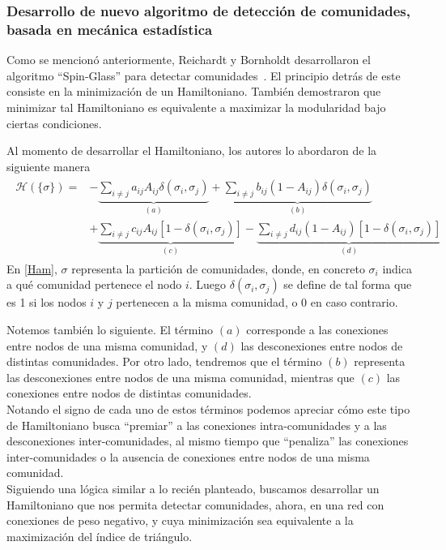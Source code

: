 \documentclass[hyperref]{proyectotesis}
\begin{document}
\subsubsection{Desarrollo de nuevo algoritmo de detección de comunidades, basada en mecánica estadística} 
Como se mencionó anteriormente, Reichardt y Bornholdt desarrollaron el algoritmo ``Spin-Glass'' para detectar comunidades~\cite{reichardt_statistical_2006}. El principio detrás de este consiste en la minimización de un Hamiltoniano. También demostraron que minimizar tal Hamiltoniano es equivalente a maximizar la modularidad bajo ciertas condiciones.

Al momento de desarrollar el Hamiltoniano, los autores lo abordaron de la siguiente manera
\begin{align}
\begin{split}
    \mathcal{H}(\{\sigma\}) = &- \underbrace{\sum_{i\neq j} a_{ij}A_{ij}\delta(\sigma_i,\sigma_j)}_{(a)} + \underbrace{\sum_{i\neq j} b_{ij}(1 - A_{ij})\delta(\sigma_i,\sigma_j)}_{(b)} \\
                              &+ \underbrace{\sum_{i\neq j} c_{ij} A_{ij}[1 - \delta(\sigma_i,\sigma_j)] }_{(c)} - \underbrace{\sum_{i\neq j} d_{ij} (1-A_{ij})[1 - \delta(\sigma_i,\sigma_j)]}_{(d)}
\end{split}
\label{Ham}
\end{align}
En \eqref{Ham}, $\sigma$ representa la partición de comunidades, donde, en concreto $\sigma_i$ indica a qué comunidad pertenece el nodo $i$. Luego $\delta(\sigma_i,\sigma_j)$ se define de tal forma que es 1 si los nodos $i$ y $j$ pertenecen a la misma comunidad, o 0 en caso contrario.

Notemos también lo siguiente. El término $(a)$ corresponde a las conexiones entre nodos de una misma comunidad, y $(d)$ las desconexiones entre nodos de distintas comunidades. Por otro lado, tendremos que el término  $(b)$ representa las desconexiones entre nodos de una misma comunidad, mientras que $(c)$ las conexiones entre nodos de distintas comunidades.\\

Notando el signo de cada uno de estos términos podemos apreciar cómo este tipo de Hamiltoniano busca ``premiar'' a las conexiones intra-comunidades y a las desconexiones inter-comunidades, al mismo tiempo que ``penaliza'' las conexiones inter-comunidades o la ausencia de conexiones entre nodos de una misma comunidad.
\\

Siguiendo una lógica similar a lo recién planteado, buscamos desarrollar un Hamiltoniano que nos permita detectar comunidades, ahora, en una red con conexiones de peso negativo, y cuya minimización sea equivalente a la maximización del índice de triángulo.
\end{document}
